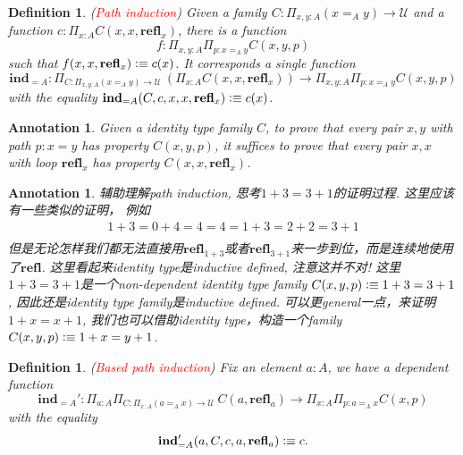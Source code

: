 \documentclass{article}
\newtheorem{definition}[theorem]{Definition}
\newtheorem{annotation}[theorem]{Annotation}
\newcommand{\redt}[1]{\textcolor{red}{#1}}
\newcommand{\defeqv}{\vcentcolon\equiv}
\newcommand{\refl}{\textbf{refl}}
\newcommand{\ind}{\textbf{ind}}
\begin{document}
\begin{definition}
\rm (\redt{Path induction}) Given a family $C : \Pi_{x,y : A} (x =_A y) \to \mathcal{U}$ and a function $c : \Pi_{x : A} C(x, x, \refl_x)$, there is a function 
\[
    f : \Pi_{x,y : A} \Pi_{p : x =_A y} C(x,y,p)
\]
such that $f(x,x,\refl_x) \defeqv c(x)$. It corresponds a single function
\[
    \ind_{=A} : \Pi_{C : \Pi_{x, y : A} (x =_A y) \to \mathcal{U}}~ (\Pi_{x : A} C(x,x,\refl_x)) \to \Pi_{x, y : A} \Pi_{p : x=_A y} C(x,y,p)
\]
with the equality $\ind_{=A}(C,c,x,x,\refl_x) \defeqv c(x)$.
\end{definition}

\begin{annotation}
\rm Given a identity type family $C$, to prove that every pair $x,y$ with path $p : x = y$ has property $C(x,y,p)$, it suffices to prove that every pair $x,x$ with loop $\refl_x$ has property $C(x,x,\refl_x)$. 
\end{annotation}

\begin{annotation}
\rm 辅助理解path induction, 思考$1 + 3 = 3 + 1$的证明过程. 这里应该有一些类似的证明， 例如
\[
\begin{aligned}
    1 + 3 = 0 + 4 = 4 = 4 = 1 + 3 = 2 + 2 = 3 + 1 \\
\end{aligned}
\]
但是无论怎样我们都无法直接用$\refl_{1+3}$或者$\refl_{3+1}$来一步到位，而是连续地使用了$\refl$. 这里看起来identity type是inductive defined, 注意这并不对! 这里$1 + 3 = 3 + 1$是一个non-dependent identity type family $C(x,y,p) \defeqv 1 + 3 = 3 + 1$, 因此还是identity type family是inductive defined. 可以更general一点，来证明 $1 + x = x + 1$, 我们也可以借助identity type，构造一个family $C(x, y, p) \defeqv 1 + x = y + 1$.
\end{annotation}

\begin{definition}
\rm (\redt{Based path induction}) Fix an element $a :A$, we have a dependent function
\[
    \ind_{=A}' : \Pi_{a : A} \Pi_{C : \Pi_{x : A} (a =_A x) \to \mathcal{U}}~  C(a,\refl_a) \to \Pi_{x : A} \Pi_{p : a=_A x} C(x, p) 
\]
with the equality 
\[
    \ind_{=A}'(a, C, c, a,  \refl_a) \defeqv c.
\]
\end{definition}
\end{document}
